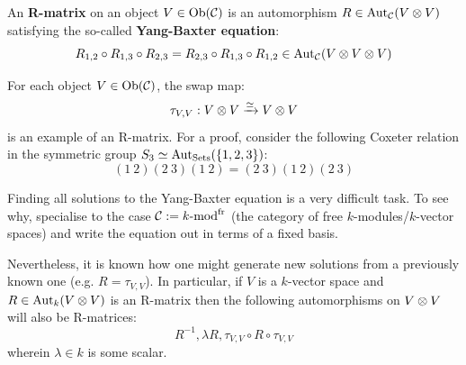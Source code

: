         \begin{definition}[R-matrices] \label{def: R_matrices}
            An \textbf{R-matrix} on an object $V \in \mathrm{Ob}(\mathcal{C})$ is an automorphism $R \in \Aut_{\C}(V \tensor V)$ satisfying the so-called \textbf{Yang-Baxter equation}:
                $$R_{1, 2} \circ R_{1, 3} \circ R_{2, 3} = R_{2, 3} \circ R_{1, 3} \circ R_{1, 2} \in \Aut_{\C}(V \tensor V \tensor V)$$
        \end{definition}
        \begin{example}
            For each object $V \in \mathrm{Ob}(\mathcal{C})$, the swap map:
                $$\tau_{V, V}: V \tensor V \xrightarrow[]{\cong} V \tensor V$$
            is an example of an R-matrix. For a proof, consider the following Coxeter relation in the symmetric group $S_3 \simeq \operatorname{Aut}_{\mathrm{Sets}}(\{1, 2, 3\})$:
                $$(1 \: 2)(2 \: 3)(1 \: 2) = (2 \: 3)(1 \: 2)(2 \: 3)$$
        \end{example}
        \begin{remark}
            Finding all solutions to the Yang-Baxter equation is a very difficult task. To see why, specialise to the case $\mathcal{C} := k\text{-}\mathrm{mod}^{\mathrm{fr}}$ (the category of free $k$-modules/$k$-vector spaces) and write the equation out in terms of a fixed basis. 
            
            Nevertheless, it is known how one might generate new solutions from a previously known one (e.g. $R = \tau_{V, V}$). In particular, if $V$ is a $k$-vector space and $R \in \Aut_k(V \tensor V)$ is an R-matrix then the following automorphisms on $V \tensor V$ will also be R-matrices:
                $$R^{-1}, \lambda R, \tau_{V, V} \circ R \circ \tau_{V, V}$$
            wherein $\lambda \in k$ is some scalar.
        \end{remark}
